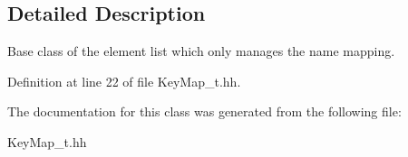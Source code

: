 \subsection{Detailed Description}
Base class of the element list which only manages the name mapping. 

Definition at line 22 of file Key\-Map\-\_\-t.\-hh.



The documentation for this class was generated from the following file\-:\begin{DoxyCompactItemize}
\item 
Key\-Map\-\_\-t.\-hh\end{DoxyCompactItemize}
